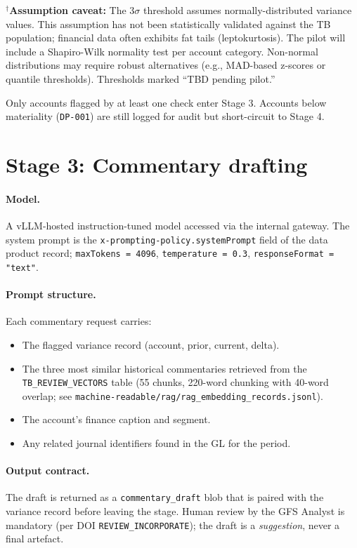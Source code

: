 \documentclass[11pt,a4paper,twoside]{report}
\newcommand{\corpus}{}
\begin{document}
\noindent$^{\dagger}$\textbf{Assumption caveat:} The $3\sigma$ threshold assumes
normally-distributed variance values. This assumption has not been statistically
validated against the TB population; financial data often exhibits fat tails
(leptokurtosis). The pilot will include a Shapiro-Wilk normality test per account
category. Non-normal distributions may require robust alternatives (e.g., MAD-based
z-scores or quantile thresholds). Thresholds marked ``TBD pending pilot.''

Only accounts flagged by at least one check enter Stage 3. Accounts
below materiality (\texttt{DP-001}) are still logged for audit but
short-circuit to Stage 4.

\section{Stage 3: Commentary drafting}

\paragraph{Model.} A vLLM-hosted instruction-tuned model accessed
via the internal gateway. The system prompt is the
\texttt{x-prompting-policy.systemPrompt} field of the data product
record; \texttt{maxTokens = 4096}, \texttt{temperature = 0.3},
\texttt{responseFormat = "text"}.

\paragraph{Prompt structure.} Each commentary request carries:
\begin{itemize}
\item The flagged variance record (account, prior, current, delta).
\item The three most similar historical commentaries retrieved from
the \texttt{TB\_REVIEW\_VECTORS} table (55 chunks, 220-word
chunking with 40-word overlap; see
\corpus\texttt{machine-readable/rag/rag\_embedding\_records.jsonl}).
\item The account's finance caption and segment.
\item Any related journal identifiers found in the GL for the period.
\end{itemize}

\paragraph{Output contract.} The draft is returned as a
\texttt{commentary\_draft} blob that is paired with the variance
record before leaving the stage. Human review by the GFS Analyst is
mandatory (per DOI \texttt{REVIEW\_INCORPORATE}); the draft is a
\emph{suggestion}, never a final artefact.
\end{document}
